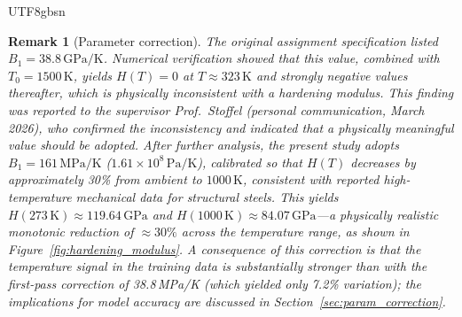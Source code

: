 \documentclass[a4paper,12pt]{report}
\newtheorem{remark}{Remark}
\begin{document}
\begin{CJK}{UTF8}{gbsn}
\begin{remark}[Parameter correction]
The original assignment specification listed $B_1 = 38.8\,\mathrm{GPa/K}$.
Numerical verification showed that this value, combined with $T_0 = 1500\,\mathrm{K}$,
yields $H(T) = 0$ at $T \approx 323\,\mathrm{K}$ and strongly negative values thereafter,
which is physically inconsistent with a hardening modulus.
This finding was reported to the supervisor Prof.\ Stoffel (personal communication,
March 2026), who confirmed the inconsistency and indicated that a physically meaningful
value should be adopted.
After further analysis, the present study adopts $B_1 = 161\,\mathrm{MPa/K}$
($1.61\times10^8\,\mathrm{Pa/K}$), calibrated so that $H(T)$ decreases by approximately
30\% from ambient to $1000\,\mathrm{K}$, consistent with reported high-temperature
mechanical data for structural steels.
This yields $H(273\,\mathrm{K}) \approx 119.64\,\mathrm{GPa}$ and
$H(1000\,\mathrm{K}) \approx 84.07\,\mathrm{GPa}$---a physically realistic monotonic
reduction of $\approx 30\%$ across the temperature range, as shown in
Figure~\ref{fig:hardening_modulus}.
A consequence of this correction is that the temperature signal in the training data is
substantially stronger than with the first-pass correction of 38.8\,MPa/K (which yielded
only 7.2\% variation); the implications for model accuracy are discussed in
Section~\ref{sec:param_correction}.
\end{remark}

\begin{figure}[H]
  \centering
\end{figure}
\end{CJK}
\end{document}
